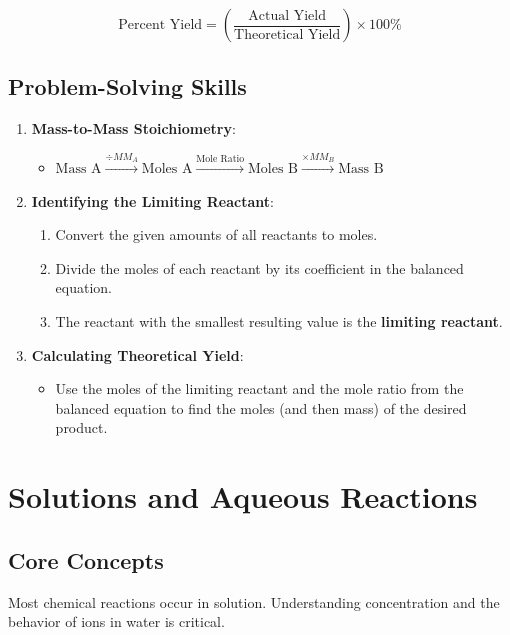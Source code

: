 \documentclass[11pt]{article}
\begin{document}
\begin{tcolorbox}[memorize, title=Reaction Efficiency *]
    \[ \text{Percent Yield} = \left( \frac{\text{Actual Yield}}{\text{Theoretical Yield}} \right) \times 100\% \]
\end{tcolorbox}

\subsection{Problem-Solving Skills}
\begin{enumerate}
    \item \textbf{Mass-to-Mass Stoichiometry}:
    \begin{itemize}
        \item $\text{Mass A} \xrightarrow{\div MM_A} \text{Moles A} \xrightarrow{\text{Mole Ratio}} \text{Moles B} \xrightarrow{\times MM_B} \text{Mass B}$
    \end{itemize}

    \item \textbf{Identifying the Limiting Reactant}:
    \begin{enumerate}[label=\alph*)]
        \item Convert the given amounts of all reactants to moles.
        \item Divide the moles of each reactant by its coefficient in the balanced equation.
        \item The reactant with the smallest resulting value is the \textbf{limiting reactant}.
    \end{enumerate}

    \item \textbf{Calculating Theoretical Yield}:
    \begin{itemize}
        \item Use the moles of the limiting reactant and the mole ratio from the balanced equation to find the moles (and then mass) of the desired product.
    \end{itemize}
\end{enumerate}

\newpage

\section{Solutions and Aqueous Reactions}

\subsection{Core Concepts}
Most chemical reactions occur in solution. Understanding concentration and the behavior of ions in water is critical.
\end{document}
